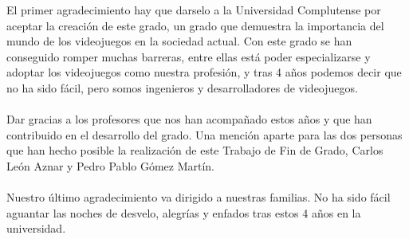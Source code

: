 El primer agradecimiento hay que darselo a la Universidad Complutense por aceptar la creaci\'on de este grado, un grado que demuestra la importancia del mundo de los videojuegos en la sociedad actual. Con este grado se han conseguido romper muchas barreras, entre ellas est\'a poder especializarse y adoptar los videojuegos como nuestra profesi\'on, y tras 4 a\~nos podemos decir que no ha sido f\'acil, pero somos ingenieros y desarrolladores de videojuegos.
\\
\\
Dar gracias a los profesores que nos han acompa\~nado estos a\~nos y que han contribuido en el desarrollo del grado. Una menci\'on aparte para las dos personas que han hecho posible la realizaci\'on de este Trabajo de Fin de Grado, Carlos Le\'on Aznar y Pedro Pablo G\'omez Mart\'in.
\\
\\
Nuestro \'ultimo  agradecimiento va dirigido a nuestras familias. No ha sido f\'acil aguantar las noches de desvelo, alegr\'ias y enfados tras estos 4 a\~nos en la universidad.
\\

\endinput
